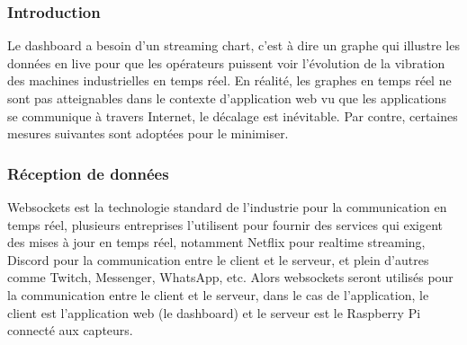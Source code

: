 \documentclass{template}
\begin{document}
\subsubsection{Introduction}
Le dashboard a besoin d'un streaming chart, c'est à dire un graphe qui illustre les données en live pour que les opérateurs puissent voir l'évolution de la vibration des machines industrielles en temps réel. En réalité, les graphes en temps réel ne sont pas atteignables dans le contexte d'application web vu que les applications se communique à travers Internet, le décalage est inévitable. Par contre, certaines mesures suivantes sont adoptées pour le minimiser.
\subsubsection{Réception de données}
Websockets est la technologie standard de l'industrie pour la communication en temps réel, plusieurs entreprises \cite{ablyWhatWebSockets} l'utilisent pour fournir des services qui exigent des mises à jour en temps réel, notamment Netflix pour realtime streaming, Discord pour la communication entre le client et le serveur, et plein d'autres comme Twitch, Messenger, WhatsApp, etc. Alors websockets seront utilisés pour la communication entre le client et le serveur, dans le cas de l'application, le client est l'application web (le dashboard) et le serveur est le Raspberry Pi connecté aux capteurs. 
\end{document}
